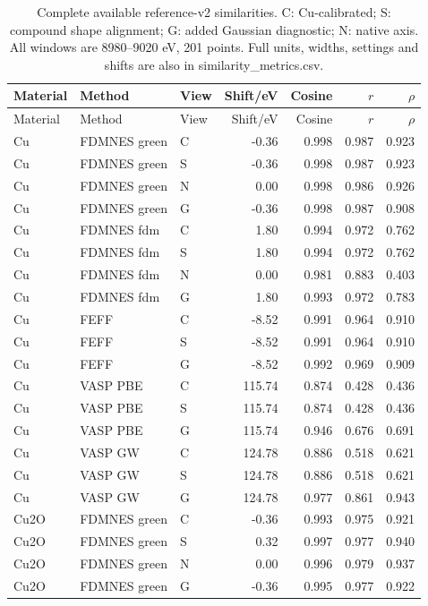 \small\begin{longtable}{lllrrrr}
\caption{Complete available reference-v2 similarities. C: Cu-calibrated; S: compound shape alignment; G: added Gaussian diagnostic; N: native axis. All windows are 8980--9020 eV, 201 points. Full units, widths, settings and shifts are also in similarity\_metrics.csv.}\\
\toprule Material & Method & View & Shift/eV & Cosine & $r$ & $\rho$\\\midrule\endfirsthead
\toprule Material & Method & View & Shift/eV & Cosine & $r$ & $\rho$\\\midrule\endhead
Cu & FDMNES green & C & -0.36 & 0.998 & 0.987 & 0.923\\
Cu & FDMNES green & S & -0.36 & 0.998 & 0.987 & 0.923\\
Cu & FDMNES green & N & 0.00 & 0.998 & 0.986 & 0.926\\
Cu & FDMNES green & G & -0.36 & 0.998 & 0.987 & 0.908\\
Cu & FDMNES fdm & C & 1.80 & 0.994 & 0.972 & 0.762\\
Cu & FDMNES fdm & S & 1.80 & 0.994 & 0.972 & 0.762\\
Cu & FDMNES fdm & N & 0.00 & 0.981 & 0.883 & 0.403\\
Cu & FDMNES fdm & G & 1.80 & 0.993 & 0.972 & 0.783\\
Cu & FEFF & C & -8.52 & 0.991 & 0.964 & 0.910\\
Cu & FEFF & S & -8.52 & 0.991 & 0.964 & 0.910\\
Cu & FEFF & G & -8.52 & 0.992 & 0.969 & 0.909\\
Cu & VASP PBE & C & 115.74 & 0.874 & 0.428 & 0.436\\
Cu & VASP PBE & S & 115.74 & 0.874 & 0.428 & 0.436\\
Cu & VASP PBE & G & 115.74 & 0.946 & 0.676 & 0.691\\
Cu & VASP GW & C & 124.78 & 0.886 & 0.518 & 0.621\\
Cu & VASP GW & S & 124.78 & 0.886 & 0.518 & 0.621\\
Cu & VASP GW & G & 124.78 & 0.977 & 0.861 & 0.943\\
Cu2O & FDMNES green & C & -0.36 & 0.993 & 0.975 & 0.921\\
Cu2O & FDMNES green & S & 0.32 & 0.997 & 0.977 & 0.940\\
Cu2O & FDMNES green & N & 0.00 & 0.996 & 0.979 & 0.937\\
Cu2O & FDMNES green & G & -0.36 & 0.995 & 0.977 & 0.922\\

\end{longtable}
